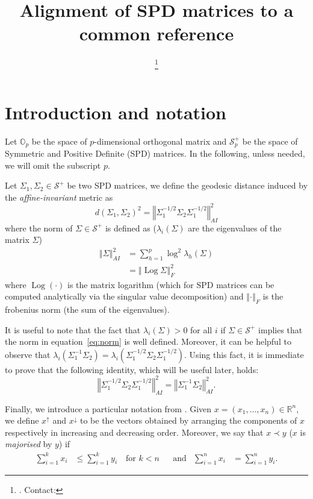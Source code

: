 \documentclass[fleqn]{article}
\title{Alignment of SPD matrices to a common reference}
\author{\myName\thanks{\myDept. Contact: \myMail}}
\theoremstyle{theorem}
\theoremstyle{definition}
\DeclareMathOperator{\logm}{Log}
\newcommand{\norm}[2][]{\left\Vert#2\right\Vert_{#1}}
\begin{document}
    \maketitle

    \section{Introduction and notation}
    Let $\mathbb{O}_p$ be the space of $p$-dimensional orthogonal matrix and $\mathcal{S}_p^+$ be the space of Symmetric and Positive Definite (SPD) matrices. In the following, unless needed, we will omit the subscript $p$.

    Let $\Sigma_1, \Sigma_2 \in \mathcal{S}^+$ be two SPD matrices, we define the geodesic distance induced by the \emph{affine-invariant} metric \cite{Bhatia2007} as
    \begin{equation}\label{eq:dist}
        d(\Sigma_1, \Sigma_2)^2 = \norm[AI]{\Sigma_1^{-1/2}\Sigma_2\Sigma_1^{-1/2}}^2
    \end{equation}
    where the norm of $\Sigma\in\mathcal{S}^+$ is defined as ($\lambda_i(\Sigma)$ are the eigenvalues of the matrix $\Sigma$)
    \begin{align}
        \norm[AI]{\Sigma}^2 &= \sum_{h=1}^{p} \log^2\lambda_h(\Sigma)\label{eq:norm}\\
        &= \norm[F]{\logm\Sigma}^2\nonumber
    \end{align}
    where $\logm(\cdot)$ is the matrix logarithm (which for SPD matrices can be computed analytically via the singular value decomposition) and $\norm[F]{\cdot}$ is the frobenius norm (the sum of the eigenvalues).

    It is useful to note that the fact that $\lambda_i(\Sigma) > 0$ for all $i$ if $\Sigma\in\mathcal{S}^+$ implies that the norm in equation~\eqref{eq:norm} is well defined. Moreover, it can be helpful to observe that $\lambda_i(\Sigma_1^{-1}\Sigma_2) = \lambda_i(\Sigma_1^{-1/2}\Sigma_2\Sigma_1^{-1/2})$. Using this fact, it is immediate to prove that the following identity, which will be useful later, holds:
    \begin{equation}\label{eq:substitution}
        \norm[AI]{\Sigma_1^{-1/2}\Sigma_2\Sigma_1^{-1/2}}^2 = \norm[AI]{\Sigma_1^{-1}\Sigma_2}^2.
    \end{equation}

    Finally, we introduce a particular notation from \cite{Bhatia1997}.  Given $x=(x_1, \dots, x_n)\in\mathbb{R}^n$, we define $x^\uparrow$ and $x^\downarrow$ to be the vectors obtained by arranging the components of $x$ respectively in increasing and decreasing order. Moreover, we say that $x\prec y$ ($x$ is \emph{majorised} by $y$) if
    \begin{align*}
        \sum_{i=1}^{k}x_i &\leq \sum_{i=1}^{k}y_i \quad \text{for } k<n &  &\text{and}  &    \sum_{i=1}^{n}x_i &= \sum_{i=1}^{n}y_i.
    \end{align*}
\end{document}
